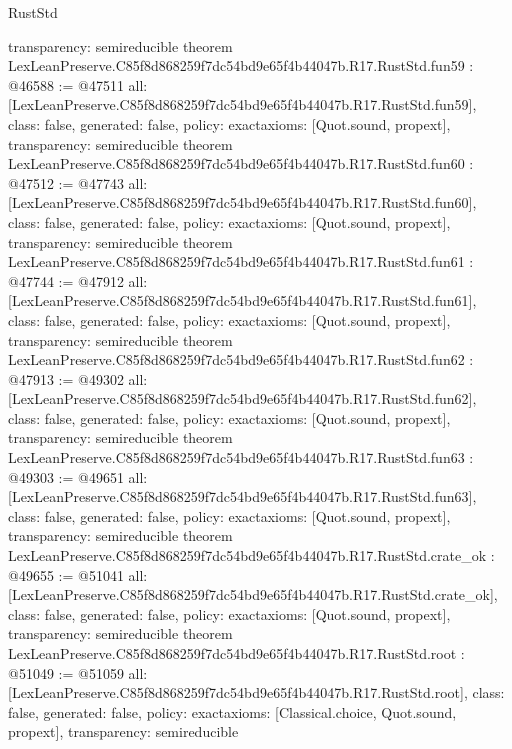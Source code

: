 \begin{lexlean}{RustStd}
\begin{coremodule}
{  transparency: semireducible
}
theorem LexLeanPreserve.C85f8d868259f7dc54bd9e65f4b44047b.R17.RustStd.fun59 : @46588 := @47511 {
  all: [LexLeanPreserve.C85f8d868259f7dc54bd9e65f4b44047b.R17.RustStd.fun59],
  class: false,
  generated: false,
  policy: exact{axioms: [Quot.sound, propext]},
  transparency: semireducible
}
theorem LexLeanPreserve.C85f8d868259f7dc54bd9e65f4b44047b.R17.RustStd.fun60 : @47512 := @47743 {
  all: [LexLeanPreserve.C85f8d868259f7dc54bd9e65f4b44047b.R17.RustStd.fun60],
  class: false,
  generated: false,
  policy: exact{axioms: [Quot.sound, propext]},
  transparency: semireducible
}
theorem LexLeanPreserve.C85f8d868259f7dc54bd9e65f4b44047b.R17.RustStd.fun61 : @47744 := @47912 {
  all: [LexLeanPreserve.C85f8d868259f7dc54bd9e65f4b44047b.R17.RustStd.fun61],
  class: false,
  generated: false,
  policy: exact{axioms: [Quot.sound, propext]},
  transparency: semireducible
}
theorem LexLeanPreserve.C85f8d868259f7dc54bd9e65f4b44047b.R17.RustStd.fun62 : @47913 := @49302 {
  all: [LexLeanPreserve.C85f8d868259f7dc54bd9e65f4b44047b.R17.RustStd.fun62],
  class: false,
  generated: false,
  policy: exact{axioms: [Quot.sound, propext]},
  transparency: semireducible
}
theorem LexLeanPreserve.C85f8d868259f7dc54bd9e65f4b44047b.R17.RustStd.fun63 : @49303 := @49651 {
  all: [LexLeanPreserve.C85f8d868259f7dc54bd9e65f4b44047b.R17.RustStd.fun63],
  class: false,
  generated: false,
  policy: exact{axioms: [Quot.sound, propext]},
  transparency: semireducible
}
theorem LexLeanPreserve.C85f8d868259f7dc54bd9e65f4b44047b.R17.RustStd.crate_ok : @49655 := @51041 {
  all: [LexLeanPreserve.C85f8d868259f7dc54bd9e65f4b44047b.R17.RustStd.crate_ok],
  class: false,
  generated: false,
  policy: exact{axioms: [Quot.sound, propext]},
  transparency: semireducible
}
theorem LexLeanPreserve.C85f8d868259f7dc54bd9e65f4b44047b.R17.RustStd.root : @51049 := @51059 {
  all: [LexLeanPreserve.C85f8d868259f7dc54bd9e65f4b44047b.R17.RustStd.root],
  class: false,
  generated: false,
  policy: exact{axioms: [Classical.choice, Quot.sound, propext]},
  transparency: semireducible
}


\end{coremodule}
\end{lexlean}

